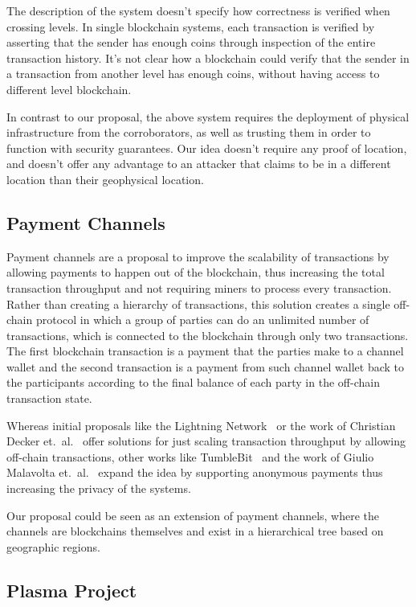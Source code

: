 The description of the system doesn't specify how correctness is verified when
crossing levels.  In single blockchain systems, each transaction is verified by
asserting that the sender has enough coins through inspection of the entire
transaction history.  It's not clear how a blockchain could verify that the
sender in a transaction from another level has enough coins, without having
access to different level blockchain.


In contrast to our proposal, the above system requires the deployment of
physical infrastructure from the corroborators, as well as trusting them in
order to function with security guarantees.  Our idea doesn't require any proof
of location, and doesn't offer any advantage to an attacker that claims to be
in a different location than their geophysical location.

\subsection{Payment Channels}

Payment channels are a proposal to improve the scalability of transactions by
allowing payments to happen out of the blockchain, thus increasing the total
transaction throughput and not requiring miners to process every transaction.
Rather than creating a hierarchy of transactions, this solution creates a
single off-chain protocol in which a group of parties can do an unlimited
number of transactions, which is connected to the blockchain through only two
transactions.  The first blockchain transaction is a payment that the parties
make to a channel wallet and the second transaction is a payment from such
channel wallet back to the participants according to the final balance of each
party in the off-chain transaction state.

Whereas initial proposals like the Lightning Network~\cite{light} or the work of
Christian Decker et.\ al.~\cite{chan1} offer solutions for just scaling
transaction throughput by allowing off-chain transactions, other works like
TumbleBit~\cite{tumble} and the work of Giulio Malavolta et.\ al.~\cite{chan2}
expand the idea by supporting anonymous payments thus increasing the privacy of
the systems.

Our proposal could be seen as an extension of payment channels, where the
channels are blockchains themselves and exist in a hierarchical tree based on
geographic regions.

\subsection{Plasma Project}

